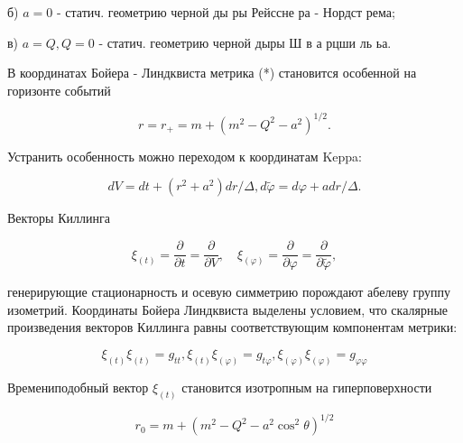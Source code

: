 \documentclass[10pt]{article}
\begin{document}
б) $a=0$ - статич. геометрию черной ды ры Рейссне ра - Нордст рема;



в) $a=Q, Q=0$ - статич. геометрию черной дыры Ш в а рцши ль ьа.



В координатах Бойера - Линдквиста метрика (*) становится особенной на горизонте событий



\[

r=r_{+}=m+\left(m^{2}-Q^{2}-a^{2}\right)^{1 / 2} .

\]



Устранить особенность можно переходом к координатам Keppa:



\[

d V=d t+\left(r^{2}+a^{2}\right) d r / \Delta, d \widetilde{\varphi}=d \varphi+a d r / \Delta .

\]



Векторы Киллинга



\[

\xi_{(t)}=\frac{\partial}{\partial t}=\frac{\partial}{\partial V}, \quad \xi_{(\varphi)}=\frac{\partial}{\partial \varphi}=\frac{\partial}{\partial \tilde{\varphi}},

\]



генерирующие стационарность и осевую симметрию порождают абелеву группу изометрий. Координаты Бойера Линдквиста выделены условием, что скалярные произведения векторов Киллинга равны соответствующим компонентам метрики:



\[

\xi_{(t)} \xi_{(t)}=g_{t t}, \xi_{(t)} \xi_{(\varphi)}=g_{t \varphi}, \xi_{(\varphi)} \xi_{(\varphi)}=g_{\varphi \varphi}

\]



Времениподобный вектор $\xi_{(t)}$ становится изотропным на гиперповерхности



\[

r_{0}=m+\left(m^{2}-Q^{2}-a^{2} \cos ^{2} \theta\right)^{1 / 2}

\]
\end{document}
